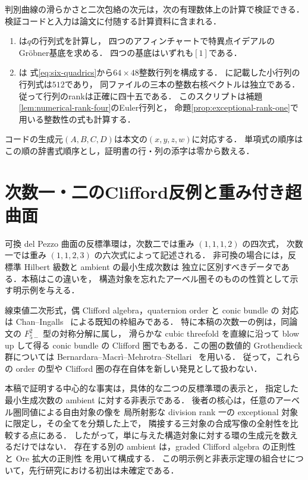 \documentclass[11pt,a4paper]{ltjsarticle}
\theoremstyle{definition}
\begin{document}
判別曲線の滑らかさと二次包絡の次元は，次の有理数体上の計算で検証できる．
検証コードと入力は論文に付随する計算資料に含まれる．
\begin{enumerate}
\item {}は$q$の行列式を計算し，
四つのアフィンチャートで特異点イデアルのGr\"obner基底を求める．
四つの基底はいずれも$[1]$である．
\item {}は
式\eqref{eq:six-quadrics}から$64\times48$整数行列を構成する．
に記載した小行列の行列式は$512$であり，
同ファイルの三本の整数右核ベクトルは独立である．
従って行列のrankは正確に四十五である．
このスクリプトは補題\ref{lem:numerical-rank-four}のEuler行列と，
命題\ref{prop:exceptional-rank-one}で用いる整数性の式も計算する．
\end{enumerate}
コードの生成元$(A,B,C,D)$は本文の$(x,y,z,w)$に対応する．
単項式の順序はこの順の辞書式順序とし，証明書の行・列の添字は零から数える．


\section{次数一・二のClifford反例と重み付き超曲面}
可換 del Pezzo 曲面の反標準環は，次数二では重み $(1,1,1,2)$ の四次式，
次数一では重み $(1,1,2,3)$ の六次式によって記述される．
非可換の場合には，反標準 Hilbert 級数と ambient の最小生成次数は
独立に区別すべきデータである．本稿はこの違いを，
構造対象を忘れたアーベル圏そのものの性質として示す明示例を与える．

線束値二次形式，偶 Clifford algebra，quaternion order と conic bundle の
対応は Chan--Ingalls~\cite{ChanIngalls2012} による既知の枠組みである．
特に本稿の次数一の例は，同論文の $F_{5-}^{2}$ 型の対称分解に属し，
滑らかな cubic threefold を直線に沿って blow up して得る conic bundle の
Clifford 圏でもある．この圏の数値的 Grothendieck 群については
Bernardara--Macr\`i--Mehrotra--Stellari~\cite{BMMS2012} を用いる．
従って，これらの order の型や Clifford 圏の存在自体を新しい発見として扱わない．

本稿で証明する中心的な事実は，具体的な二つの反標準環の表示と，
指定した最小生成次数の ambient に対する非表示である．
後者の核心は，任意のアーベル圏同値による自由対象の像を
局所射影な division rank 一の exceptional 対象に限定し，その全てを分類した上で，
隣接する三対象の合成写像の全射性を比較する点にある．
したがって，単に与えた構造対象に対する環の生成元を数えるだけではない．
存在する別の ambient は，graded Clifford algebra の正則性
\cite{CV2010,CKS2019} と Ore 拡大の正則性 \cite{CKZ2017,LWW2014} を用いて構成する．
この明示例と非表示定理の組合せについて，先行研究における初出は未確定である．
\end{document}
